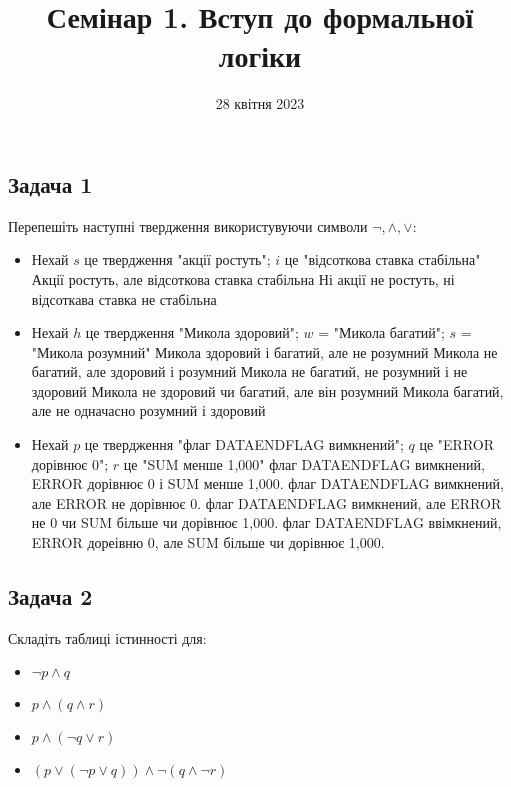 \documentclass{article}
\begin{document}
\title{Семінар 1. Вступ до формальної логіки}
\date{28 квітня 2023}

\maketitle

\subsection*{Задача 1}

Перепешіть наступні твердження використувуючи символи $\lnot, \land, \lor$:

\begin{itemize}
    \item Нехай $s$ це твердження "акції ростуть"; $i$ це "відсоткова ставка стабільна"
        \subitem Акції ростуть, але відсоткова ставка стабільна
        \subitem Ні акції не ростуть, ні відсоткава ставка не стабільна
    \item Нехай $h$ це твердження "Микола здоровий"; $w$ = "Микола багатий"; $s$ = "Микола розумний"
        \subitem Микола здоровий і багатий, але не розумний
        \subitem Микола не багатий, але здоровий і розумний
        \subitem Микола не багатий, не розумний і не здоровий
        \subitem Микола не здоровий чи багатий, але він розумний
        \subitem Микола багатий, але не одначасно розумний і здоровий
    \item Нехай $p$ це твердження "флаг DATAENDFLAG вимкнений"; $q$ це "ERROR дорівнює 0"; $r$ це "SUM менше 1,000"
        \subitem флаг DATAENDFLAG вимкнений, ERROR дорівнює 0 і SUM менше 1,000.
        \subitem флаг DATAENDFLAG вимкнений, але ERROR не дорівнює 0.
        \subitem флаг DATAENDFLAG вимкнений, але ERROR не 0 чи SUM більше чи дорівнює 1,000.
        \subitem флаг DATAENDFLAG ввімкнений, ERROR дореівню 0, але SUM більше чи дорівнює 1,000.
\end{itemize}

\subsection*{Задача 2}
Складіть таблиці істинності для:
\begin{itemize}
    \item $\lnot p \land q$
    \item $p \land (q \land r)$
    \item $p \land (\lnot q \lor r)$
    \item $(p \lor (\lnot p \lor q)) \land \lnot (q \land \lnot r)$
\end{itemize}
\end{document}
